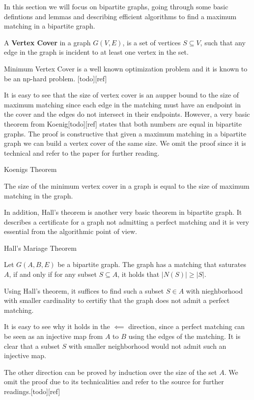 In this section we will focus on bipartite graphs, going through some basic defintions and lemmas and describing efficient algorithms to find a maximum matching in a bipartite graph.
\begin{definition}
	A \textbf{Vertex Cover} in a graph $G(V, E)$, is a set of vertices $S \subseteq V$, such that any edge in the graph is incident to at least one vertex in the set.
\end{definition}
Minimum Vertex Cover is a well known optimization problem and it is known to be an np-hard problem. [todo][ref]

It is easy to see that the size of vertex cover is an aupper bound to the size of maximum matching since each edge in the matching must have an endpoint in the cover and the edges do not intersect in their endpoints. However, a very basic theorem from Koenig[todo][ref] states that both numbers are equal in bipartite graphs. The proof is constructive that given a maximum matching in a bipartite graph we can build  a vertex cover of the same size. We omit the proof since it is technical and refer to the paper for further reading.

\begin{theorem}Koenigs Theorem

	The size of the minimum vertex cover in a graph is equal to the size of maximum matching in the graph.
\end{theorem}

In addition, Hall's theorem is another very basic theorem in bipartite graph. It describes a certificate for a graph not admitting a perfect matching and it is very essential from the algorithmic point of view.
\begin{theorem}Hall's Mariage Theorem

	Let $G(A, B, E)$ be a bipartite graph. The graph has a matching that saturates $A$, if and only if for any subset $S \subseteq A$, it holds that $|N(S)| \geq |S|$.
\end{theorem}
Using Hall's theorem, it suffices to find such a subset $S \in A$ with nieghborhood with smaller cardinality to certifiy that the graph does not admit a perfect matching.

It is easy to see why it holds in the $\impliedby$ direction, since a perfect matching can be seen as an injective map from $A$ to $B$ using the edges of the matching. It is clear that a subset $S$ with smaller neighborhood would not admit such an injective map.

The other direction can be proved by induction over the size of the set $A$. We omit the proof due to its technicalities and refer to the source for further readings.[todo][ref]


